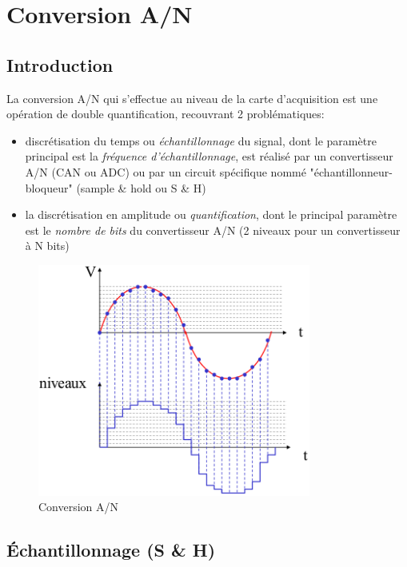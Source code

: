 \chapter{Conversion A/N}
\section{Introduction}
La conversion A/N qui s'effectue au niveau de la carte d'acquisition est une opération de double quantification, recouvrant 2 problématiques:
\begin{itemize}
	\item discrétisation du temps ou \emph{échantillonnage} du signal, dont le paramètre principal est la \emph{fréquence d'échantillonnage}, est réalisé par un convertisseur A/N (CAN ou ADC) ou par un circuit spécifique nommé "échantillonneur-bloqueur" (sample \& hold ou S \& H)
	\item la discrétisation en amplitude ou \emph{quantification}, dont le principal paramètre est le \emph{nombre de bits} du convertisseur A/N (2 niveaux pour un convertisseur à N bits)
\end{itemize}
\begin{figure}[H] 
	\centering 
	\includegraphics[width=0.8\textwidth,height=10\baselineskip,keepaspectratio]{ch5/image1} 
	\caption{Conversion A/N}
	\label{fig:conversionan} 
\end{figure}
\section{Échantillonnage (S \& H)}
